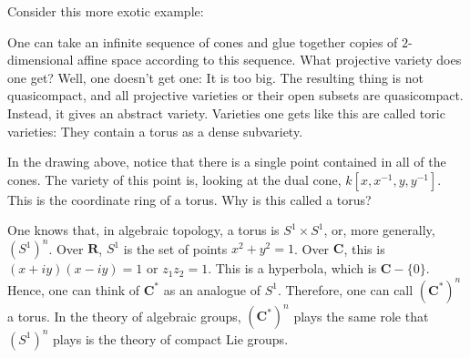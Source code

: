 \documentclass [11 pt, oneside, margin = 1 in] {article}
\begin{document}
Consider this more exotic example:
\begin{center}
\end{center}
One can take an infinite sequence of cones and glue together copies of $2$-dimensional affine space according to this sequence. What projective variety does one get? Well, one doesn't get one: It is too big. The resulting thing is not quasicompact, and all projective varieties or their open subsets are quasicompact. Instead, it gives an abstract variety. Varieties one gets like this are called toric varieties: They contain a torus as a dense subvariety.

In the drawing above, notice that there is a single point contained in all of the cones. The variety of this point is, looking at the dual cone, $k[x,x^{-1},y,y^{-1}]$. This is the coordinate ring of a torus. Why is this called a torus?

One knows that, in algebraic topology, a torus is $S^1\times S^1$, or, more generally, $(S^1)^n$. Over $\mathbf{R}$, $S^1$ is the set of points $x^2 + y^2 = 1$. Over $\mathbf{C}$, this is $(x+iy) (x-iy)=1$ or $z_1z_2=1$. This is a hyperbola, which is $\mathbf{C}-\{0\}$. Hence, one can think of $\mathbf{C}^*$ as an analogue of $S^1$. Therefore, one can call $(\mathbf{C}^*)^n$ a torus. In the theory of algebraic groups, $(\mathbf{C}^*)^n$ plays the same role that $(S^1)^n$ plays is the theory of compact Lie groups. 
\end{document}
